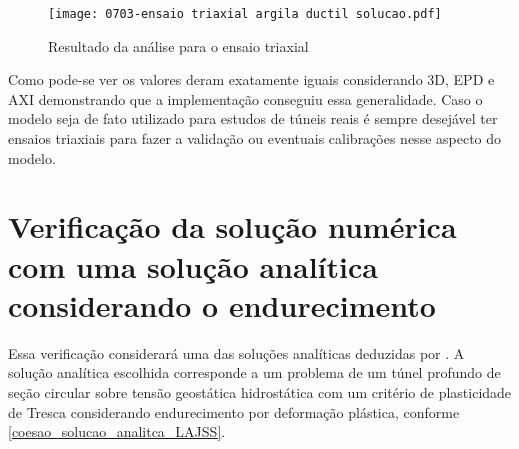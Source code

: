 \begin{figure}[H]
	\begin{center}
		\texttt{[image: 0703-ensaio triaxial argila ductil solucao.pdf]}
	\end{center}
	\caption{\label{ensaio_triaxial_solucao}Resultado da análise para o ensaio triaxial}
\end{figure}

Como pode-se ver os valores deram exatamente iguais considerando 3D, EPD e AXI demonstrando que a implementação conseguiu essa generalidade. Caso o modelo seja de fato utilizado para estudos de túneis reais é sempre desejável ter ensaios triaxiais para fazer a validação ou eventuais calibrações nesse aspecto do modelo.

\section{Verificação da solução numérica com uma solução analítica considerando o endurecimento}

Essa verificação considerará uma das soluções analíticas deduzidas por . A solução analítica escolhida corresponde a um problema de um túnel profundo de seção circular sobre tensão geostática hidrostática com um critério de plasticidade de Tresca considerando endurecimento por deformação plástica, conforme \autoref{coesao_solucao_analitca_LAJSS}. 

